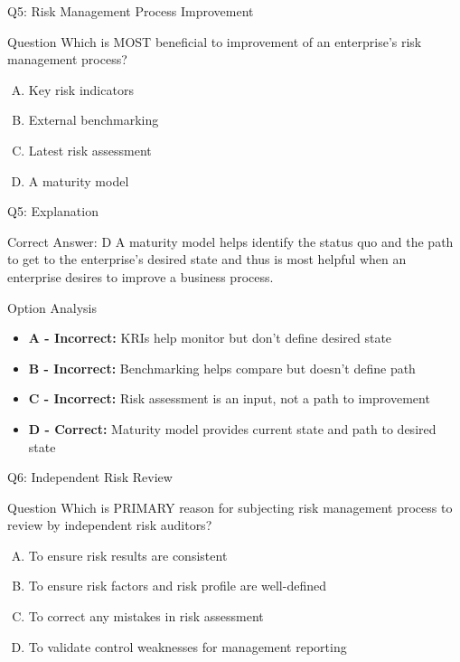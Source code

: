\documentclass{beamer}
\begin{document}
	\begin{frame}{Q5: Risk Management Process Improvement}
		\begin{block}{Question}
			Which is MOST beneficial to improvement of an enterprise's risk management process?
		\end{block}
		\begin{enumerate}[(A)]
			\item Key risk indicators
			\item External benchmarking
			\item Latest risk assessment
			\item A maturity model
		\end{enumerate}
	\end{frame}
	
	\begin{frame}{Q5: Explanation}
		\begin{block}{Correct Answer: D}
			A maturity model helps identify the status quo and the path to get to the enterprise's desired state and thus is most helpful when an enterprise desires to improve a business process.
		\end{block}
		\begin{block}{Option Analysis}
			\begin{itemize}
				\item \textbf{A - Incorrect:} KRIs help monitor but don't define desired state
				\item \textbf{B - Incorrect:} Benchmarking helps compare but doesn't define path
				\item \textbf{C - Incorrect:} Risk assessment is an input, not a path to improvement
				\item \textbf{D - Correct:} Maturity model provides current state and path to desired state
			\end{itemize}
		\end{block}
	\end{frame}
	
	\begin{frame}{Q6: Independent Risk Review}
		\begin{block}{Question}
			Which is PRIMARY reason for subjecting risk management process to review by independent risk auditors?
		\end{block}
		\begin{enumerate}[(A)]
			\item To ensure risk results are consistent
			\item To ensure risk factors and risk profile are well-defined
			\item To correct any mistakes in risk assessment
			\item To validate control weaknesses for management reporting
		\end{enumerate}
	\end{frame}
	
\end{document}
